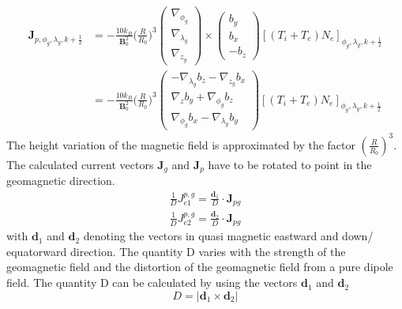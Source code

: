 \begin{equation}
  \begin{split}
  \mathbf{J}_{p,\phi_g, \lambda_g, k+\frac{1}{2}} 
       & = -  \frac{10 k_B}{\mathbf{B}_0^2} \biggl(\frac{R}{R_0} \biggr)^3 
                         \begin{pmatrix} \nabla_{\phi_g} \\
                                         \nabla_{\lambda_g}\\
                                         \nabla_{z_g}
			   \end{pmatrix}
	\times \begin{pmatrix}  b_y \\
                                b_x\\
                               -b_z
		\end{pmatrix} 
	[(T_i + T_e ) N_e]_{\phi_g, \lambda_g, k+\frac{1}{2}}  \\
	& =  -  \frac{10 k_B}{\mathbf{B}_0^2} \biggl(\frac{R}{R_0} \biggr)^3 
	 \begin{pmatrix} -\nabla_{\lambda_g} b_{z} - \nabla_{z_g} b_x      \\
                          \nabla_z  b_{y} +\nabla_{\phi_g} b_{z}     \\
                          \nabla_{\phi_g} b_{x}  -  \nabla_{\lambda_g} b_{y}
		\end{pmatrix}		
		   [(T_i + T_e ) N_e]_{\phi_g, \lambda_g, k+\frac{1}{2}} 
  \end{split}
		    \label{eq:currp_p}
\end{equation}
%
The height variation of the magnetic field is approximated by the factor 
$(\frac{R}{R_0})^3$. 
%
The calculated current vectors $\mathbf{J}_g$ and $\mathbf{J}_p$ have to be rotated to 
point in the geomagnetic direction.
%
\begin{gather}
  \frac{1}{D}{{J}}_{e1}^{p,g} = \frac{\mathbf{d}_1}{D} \cdot \mathbf{J}_{pg} \label{eq:rot_j1_pg} \\
  \frac{1}{D}{{J}}_{e2}^{p,g} = \frac{\mathbf{d}_2}{D} \cdot \mathbf{J}_{pg} \label{eq:rot_j2_pg}
\end{gather}
%
with $\mathbf{d}_{1}$ and $\mathbf{d}_{2}$ denoting the vectors in quasi magnetic eastward and down/
equatorward direction. The quantity D varies
with the strength of the geomagnetic field and the distortion of the
geomagnetic field from a pure dipole field. The quantity D can be calculated by
using the vectors $\mathbf{d}_{1}$ and $\mathbf{d}_{2}$
%
\begin{equation}
    D = |\mathbf{d}_1 \times \mathbf{d}_2| \label{eq:D}
\end{equation}
